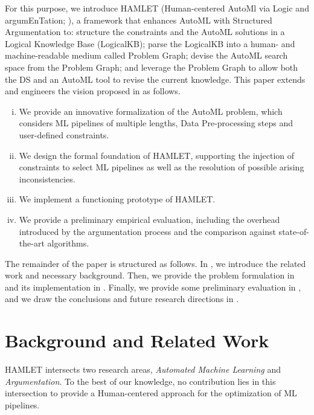 For this purpose, we introduce HAMLET (Human-centered AutoMl via Logic and argumEnTation; ), a framework that enhances AutoML with Structured Argumentation to:
structure the constraints and the AutoML solutions in a Logical Knowledge Base (LogicalKB);
parse the LogicalKB into a human- and machine-readable medium called Problem Graph;
devise the AutoML search space from the Problem Graph;
and leverage the Problem Graph to allow both the DS and an AutoML tool to revise the current knowledge.
This paper extends and engineers the vision proposed in \cite{DBLP:conf/edbt/GiovanelliP22} as follows.
\begin{enumerate}[(i)]
    \item We provide an innovative formalization of the AutoML problem, which considers ML pipelines of multiple lengths, Data Pre-processing steps and user-defined constraints.
    \item We design the formal foundation of HAMLET, supporting the injection of constraints to select ML pipelines as well as the resolution of possible arising inconsistencies.
    \item We implement a functioning prototype of HAMLET.
    \item We provide a preliminary empirical evaluation, including the overhead introduced by the argumentation process and the comparison against state-of-the-art algorithms. 
\end{enumerate}

The remainder of the paper is structured as follows. In , we introduce the related work and necessary background. Then, we provide the problem formulation in  and its implementation in .
Finally, we provide some preliminary evaluation in , and we draw the conclusions and future research directions in .

\section{Background and Related Work}\label{sec:related}
HAMLET intersects two research areas, \emph{Automated Machine Learning} and \emph{Argumentation}. 
To the best of our knowledge, no contribution lies in this intersection to provide a Human-centered approach for the optimization of ML pipelines.

